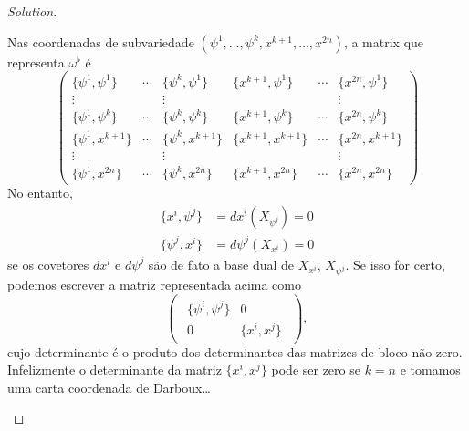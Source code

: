 \begin{proof}[Solution]
\begin{enumerate}[label=\alph*.]
	Nas coordenadas de subvariedade $(\psi^1,\ldots,\psi^k,x^{k+1},\ldots,x^{2n})$, a matrix que representa $\omega^\flat$ \'e
	\[\begin{pmatrix} \{\psi^1,\psi^1\} &\cdots &\{\psi^k,\psi^1\} &\{x^{k+1},\psi^1\} &\cdots &\{x^{2n},\psi^1\}\\
	\vdots &&\vdots &&&\vdots\\
\{\psi^1,\psi^k\} &\cdots &\{\psi^k,\psi^k\} &\{x^{k+1},\psi^k\} &\cdots &\{x^{2n},\psi^k\}\\
	\{\psi^1,x^{k+1}\} &\cdots &\{\psi^k,x^{k+1}\} &\{x^{k+1},x^{k+1}\} &\cdots &\{x^{2n},x^{k+1}\} \\
	\vdots &&\vdots &&&\vdots\\
	\{\psi^1,x^{2n}\} &\cdots &\{\psi^k,x^{2n}\} &\{x^{k+1},x^{2n}\} &\cdots &\{x^{2n},x^{2n}\}
\end{pmatrix}\]
No entanto,
\begin{align*}
	\{x^i,\psi^j\}&=dx^i(X_{\psi^j})=0\\
\{\psi^j,x^i\} &=d\psi^j(X_{x^i})=0
\end{align*}
se os covetores $dx^i$ e $d\psi^j$ s\~ao de fato a base dual de $X_{x^i}$, $X_{\psi^j}$. Se isso for certo, podemos escrever a matriz representada acima como
\[\begin{pmatrix}\begin{array}{c|c}
	\{\psi^i,\psi^j\}&0\\ \hline
	0&\{x^i,x^j\} 
\end{array}  \end{pmatrix}, \]
cujo determinante \'e o produto dos determinantes das matrizes de bloco n\~ao zero. Infelizmente o determinante da matriz $\{x^i,x^j\}$ pode ser zero se $k=n$ e tomamos uma carta coordenada de Darboux…


\end{enumerate}
\end{proof}
